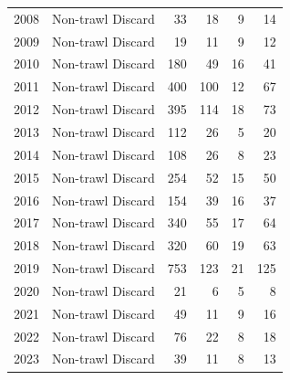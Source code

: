 \documentclass[
]{scrartcl}
\begin{document}
\begin{longtable}{rlrrrr}
2008 & Non-trawl Discard & 33 & 18 & 9 & 14 \\ 
2009 & Non-trawl Discard & 19 & 11 & 9 & 12 \\ 
2010 & Non-trawl Discard & 180 & 49 & 16 & 41 \\ 
2011 & Non-trawl Discard & 400 & 100 & 12 & 67 \\ 
2012 & Non-trawl Discard & 395 & 114 & 18 & 73 \\ 
2013 & Non-trawl Discard & 112 & 26 & 5 & 20 \\ 
2014 & Non-trawl Discard & 108 & 26 & 8 & 23 \\ 
2015 & Non-trawl Discard & 254 & 52 & 15 & 50 \\ 
2016 & Non-trawl Discard & 154 & 39 & 16 & 37 \\ 
2017 & Non-trawl Discard & 340 & 55 & 17 & 64 \\ 
2018 & Non-trawl Discard & 320 & 60 & 19 & 63 \\ 
2019 & Non-trawl Discard & 753 & 123 & 21 & 125 \\ 
2020 & Non-trawl Discard & 21 & 6 & 5 & 8 \\ 
2021 & Non-trawl Discard & 49 & 11 & 9 & 16 \\ 
2022 & Non-trawl Discard & 76 & 22 & 8 & 18 \\ 
2023 & Non-trawl Discard & 39 & 11 & 8 & 13 \\ 
\bottomrule

\end{longtable}

\endgroup

\newpage{}

\begingroup
\fontsize{9.0pt}{10.8pt}\selectfont
\end{document}
